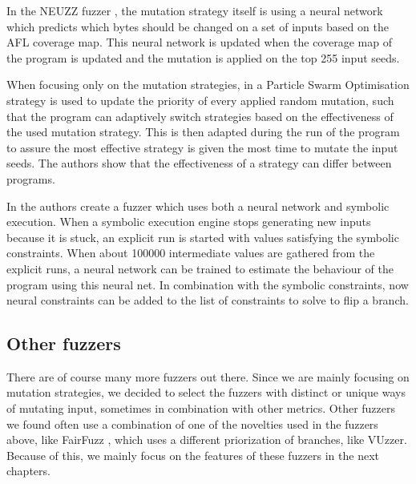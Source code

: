 In the NEUZZ fuzzer \cite{she2019neuzz}, the mutation strategy itself is using a neural network which predicts which bytes should be changed on a set of inputs based on the AFL coverage map. This neural network is updated when the coverage map of the program is updated and the mutation is applied on the top 255 input seeds.

When focusing only on the mutation strategies, in \cite{lyu2019mopt} a Particle Swarm Optimisation strategy is used to update the priority of every applied random mutation, such that the program can adaptively switch strategies based on the effectiveness of the used mutation strategy. This is then adapted during the run of the program to assure the most effective strategy is given the most time to mutate the input seeds. The authors show that the effectiveness of a strategy can differ between programs.

In \cite{shen2019neuro} the authors create a fuzzer which uses both a neural network and symbolic execution. When a symbolic execution engine stops generating new inputs because it is stuck, an explicit run is started with values satisfying the symbolic constraints. When about 100000 intermediate values are gathered from the explicit runs, a neural network can be trained to estimate the behaviour of the program using this neural net. In combination with the symbolic constraints, now neural constraints can be added to the list of constraints to solve to flip a branch. %

\subsection{Other fuzzers}
There are of course many more fuzzers out there. Since we are mainly focusing on mutation strategies, we decided to select the fuzzers with distinct or unique ways of mutating input, sometimes in combination with other metrics. Other fuzzers we found often use a combination of one of the novelties used in the fuzzers above, like FairFuzz \cite{lemieux2018fairfuzz}, which uses a different priorization of branches, like VUzzer. Because of this, we mainly focus on the features of these fuzzers in the next chapters.



